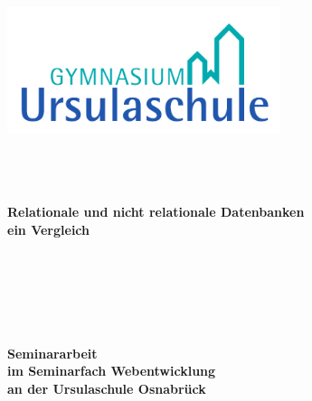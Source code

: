  \thispagestyle{empty}
\begin{titlepage}
	 \thispagestyle{empty}
\begin{center}
	 \thispagestyle{empty}


	\includegraphics[width=8cm]{"Logo_Ursulaschule_2c"}


$~~$\\
\paragraph{}$~~$\\
\textbf{\huge Relationale und nicht relationale Datenbanken} \\
\lbigskip
\textbf{\large{ein Vergleich}}\paragraph{}$~~$\\
\paragraph{}$~~$\\
\paragraph{}$~~$\\
\textbf{Seminararbeit}\\ \textbf{im Seminarfach Webentwicklung}\\ \textbf{an der Ursulaschule Osnabrück}
\paragraph{}$~~$\\

\end{center}
\end{titlepage}
